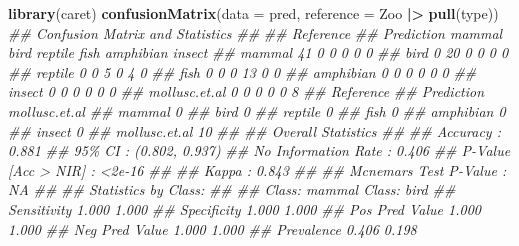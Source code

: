 \documentclass[
  notitlepage]{book}
\newenvironment{Shaded}{\begin{snugshade}}{\end{snugshade}}
\newcommand{\CommentTok}[1]{\textcolor[rgb]{0.56,0.35,0.01}{\textit{#1}}}
\newcommand{\DataTypeTok}[1]{\textcolor[rgb]{0.13,0.29,0.53}{#1}}
\newcommand{\ErrorTok}[1]{\textcolor[rgb]{0.64,0.00,0.00}{\textbf{#1}}}
\newcommand{\KeywordTok}[1]{\textcolor[rgb]{0.13,0.29,0.53}{\textbf{#1}}}
\newcommand{\NormalTok}[1]{#1}
\newcommand{\OperatorTok}[1]{\textcolor[rgb]{0.81,0.36,0.00}{\textbf{#1}}}
\newcommand{\StringTok}[1]{\textcolor[rgb]{0.31,0.60,0.02}{#1}}
\begin{document}
\begin{Shaded}
\begin{Highlighting}[]
\KeywordTok{library}\NormalTok{(caret)}
\KeywordTok{confusionMatrix}\NormalTok{(}\DataTypeTok{data =}\NormalTok{ pred, }
                \DataTypeTok{reference =}\NormalTok{ Zoo }\OperatorTok{|}\ErrorTok{\textgreater{}}\StringTok{ }\KeywordTok{pull}\NormalTok{(type))}
\CommentTok{\#\# Confusion Matrix and Statistics}
\CommentTok{\#\# }
\CommentTok{\#\#                Reference}
\CommentTok{\#\# Prediction      mammal bird reptile fish amphibian insect}
\CommentTok{\#\#   mammal            41    0       0    0         0      0}
\CommentTok{\#\#   bird               0   20       0    0         0      0}
\CommentTok{\#\#   reptile            0    0       5    0         4      0}
\CommentTok{\#\#   fish               0    0       0   13         0      0}
\CommentTok{\#\#   amphibian          0    0       0    0         0      0}
\CommentTok{\#\#   insect             0    0       0    0         0      0}
\CommentTok{\#\#   mollusc.et.al      0    0       0    0         0      8}
\CommentTok{\#\#                Reference}
\CommentTok{\#\# Prediction      mollusc.et.al}
\CommentTok{\#\#   mammal                    0}
\CommentTok{\#\#   bird                      0}
\CommentTok{\#\#   reptile                   0}
\CommentTok{\#\#   fish                      0}
\CommentTok{\#\#   amphibian                 0}
\CommentTok{\#\#   insect                    0}
\CommentTok{\#\#   mollusc.et.al            10}
\CommentTok{\#\# }
\CommentTok{\#\# Overall Statistics}
\CommentTok{\#\#                                         }
\CommentTok{\#\#                Accuracy : 0.881         }
\CommentTok{\#\#                  95\% CI : (0.802, 0.937)}
\CommentTok{\#\#     No Information Rate : 0.406         }
\CommentTok{\#\#     P{-}Value [Acc \textgreater{} NIR] : \textless{}2e{-}16        }
\CommentTok{\#\#                                         }
\CommentTok{\#\#                   Kappa : 0.843         }
\CommentTok{\#\#                                         }
\CommentTok{\#\#  Mcnemar\textquotesingle{}s Test P{-}Value : NA            }
\CommentTok{\#\# }
\CommentTok{\#\# Statistics by Class:}
\CommentTok{\#\# }
\CommentTok{\#\#                      Class: mammal Class: bird}
\CommentTok{\#\# Sensitivity                  1.000       1.000}
\CommentTok{\#\# Specificity                  1.000       1.000}
\CommentTok{\#\# Pos Pred Value               1.000       1.000}
\CommentTok{\#\# Neg Pred Value               1.000       1.000}
\CommentTok{\#\# Prevalence                   0.406       0.198}

\end{Highlighting}
\end{Shaded}
\end{document}
